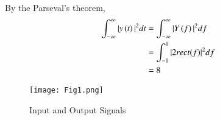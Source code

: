 \documentclass[journal,12pt,twocolumn]{IEEEtran}
\begin{document}
By the Parseval's theorem,
\begin{align}
    \int_{-\infty}^{\infty} |y\left(t\right)|^{2} dt &= \int_{-\infty}^{\infty} |Y\left(f\right)|^{2} df\\
    &= \int_{-1}^{1} |2rect(f)|^2df\\
    &= 8
\end{align}
\begin{figure}[htp]
    \centering
    \texttt{[image: Fig1.png]}
    \caption{Input and Output Signals}
    \label{fig:plot}
\end{figure}
\end{document}
